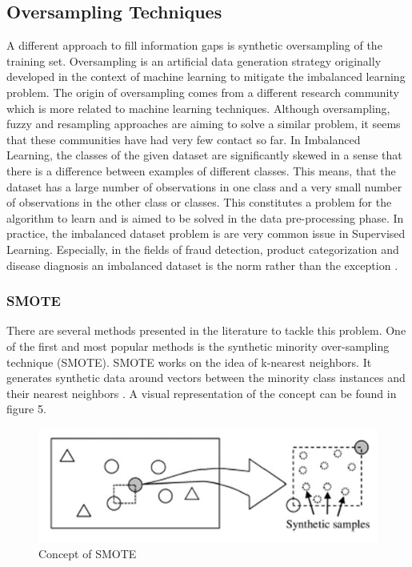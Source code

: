 \documentclass[parskip=full]{scrartcl}
\begin{document}
\subsection{Oversampling Techniques}

A different approach to fill information gaps is synthetic oversampling of the
training set. Oversampling is an artificial data generation strategy originally
developed in the context of machine learning to mitigate the imbalanced 
learning problem. The origin of oversampling comes from a different research 
community which is more related to machine learning techniques. Although 
oversampling, fuzzy and resampling approaches are aiming to solve a similar 
problem, it seems that these communities have had very few contact so far. In 
Imbalanced Learning, the classes of the given dataset are significantly skewed 
in a sense that there is a difference between examples of different classes. 
This means, that the dataset has a large number of observations in one class 
and a very small number of observations in the other class or classes. This 
constitutes a problem for the algorithm to learn and is aimed to be solved in 
the data pre-processing phase. In practice, the imbalanced dataset problem is 
are very common issue in Supervised Learning. Especially, in the fields of 
fraud detection, product categorization and disease diagnosis an imbalanced 
dataset is the norm rather than the exception \cite{He.2013}. 

\subsubsection{SMOTE}

There are several methods presented in the literature to tackle this problem.
One of the first and most popular methods is the synthetic minority
over-sampling technique (SMOTE). SMOTE works on the idea of k-nearest
neighbors. It generates synthetic data around vectors between the minority
class instances and their nearest neighbors \cite{Chawla.2002}. A visual
representation of the concept can be found in figure 5.

\begin{figure}[H]
	\centering
	\includegraphics[width=0.5\linewidth]{./resources/smote}
	\caption{Concept of SMOTE}
	\label{fig:smote}
\end{figure}
\end{document}
